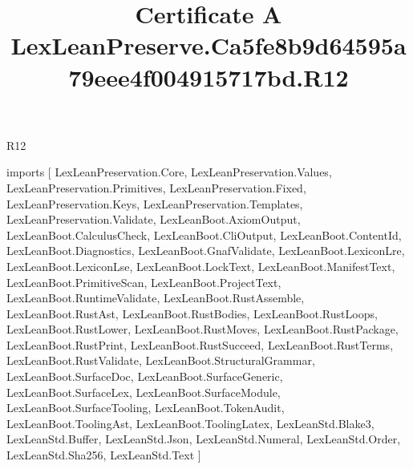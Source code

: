 \begin{lexlean}{R12}
\title{Certificate A LexLeanPreserve.Ca5fe8b9d64595a79eee4f004915717bd.R12}
\begin{coremodule}
imports [
  LexLeanPreservation.Core,
  LexLeanPreservation.Values,
  LexLeanPreservation.Primitives,
  LexLeanPreservation.Fixed,
  LexLeanPreservation.Keys,
  LexLeanPreservation.Templates,
  LexLeanPreservation.Validate,
  LexLeanBoot.AxiomOutput,
  LexLeanBoot.CalculusCheck,
  LexLeanBoot.CliOutput,
  LexLeanBoot.ContentId,
  LexLeanBoot.Diagnostics,
  LexLeanBoot.GnafValidate,
  LexLeanBoot.LexiconLre,
  LexLeanBoot.LexiconLse,
  LexLeanBoot.LockText,
  LexLeanBoot.ManifestText,
  LexLeanBoot.PrimitiveScan,
  LexLeanBoot.ProjectText,
  LexLeanBoot.RuntimeValidate,
  LexLeanBoot.RustAssemble,
  LexLeanBoot.RustAst,
  LexLeanBoot.RustBodies,
  LexLeanBoot.RustLoops,
  LexLeanBoot.RustLower,
  LexLeanBoot.RustMoves,
  LexLeanBoot.RustPackage,
  LexLeanBoot.RustPrint,
  LexLeanBoot.RustSucceed,
  LexLeanBoot.RustTerms,
  LexLeanBoot.RustValidate,
  LexLeanBoot.StructuralGrammar,
  LexLeanBoot.SurfaceDoc,
  LexLeanBoot.SurfaceGeneric,
  LexLeanBoot.SurfaceLex,
  LexLeanBoot.SurfaceModule,
  LexLeanBoot.SurfaceTooling,
  LexLeanBoot.TokenAudit,
  LexLeanBoot.ToolingAst,
  LexLeanBoot.ToolingLatex,
  LexLeanStd.Blake3,
  LexLeanStd.Buffer,
  LexLeanStd.Json,
  LexLeanStd.Numeral,
  LexLeanStd.Order,
  LexLeanStd.Sha256,
  LexLeanStd.Text
]


\end{coremodule}
\end{lexlean}
